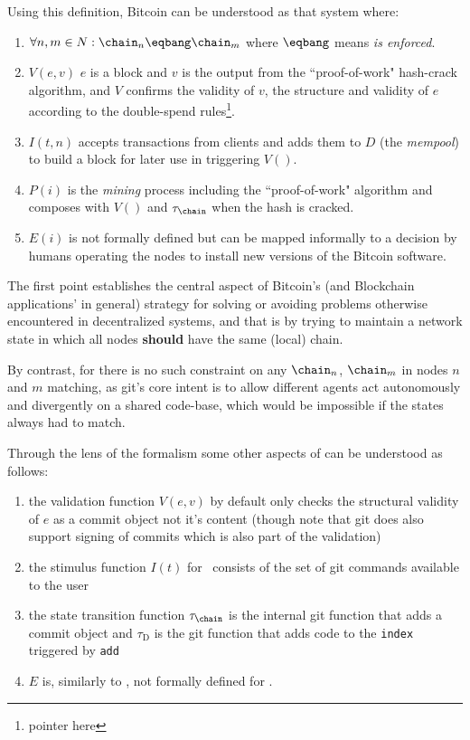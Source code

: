 \documentclass[twocolumn,showpacs,
  nofootinbib,aps,superscriptaddress,
  eqsecnum,prd,notitlepage,showkeys,10pt]{revtex4-1}
\begin{document}
Using this definition, Bitcoin can be understood as that system \sbtc where:
\begin{enumerate}
\item $\forall n,m \in N: \chain_n\eqbang\chain_m$ where $\eqbang$ means \textit{is enforced}.
\item $V(e,v)$ $e$ is a block and $v$ is the output from the ``proof-of-work" hash-crack algorithm, and $V$ confirms the validity of $v$, the structure and validity of $e$ according to the double-spend rules\footnote{pointer here}.
\item $I(t,n)$ accepts transactions from clients and adds them to $D$ (the \textit{mempool}) to build a block for later use in triggering $V()$.
\item $P(i)$ is the \textit{mining} process including the ``proof-of-work" algorithm and composes with $V()$ and $\tau_\chain$ when the hash is cracked.
\item $E(i)$ is not formally defined but can be mapped informally to a decision by humans operating the nodes to install new versions of the Bitcoin software.
\end{enumerate}

The first point establishes the central aspect of Bitcoin's (and Blockchain applications' in general) strategy for solving or avoiding problems otherwise encountered in decentralized systems, and that is by trying to maintain a network state in which all nodes \textbf{should} have the same (local) chain.

By contrast, for \sgit there is no such constraint on any $\chain_n$, $\chain_m$ in nodes $n$ and $m$ matching, as git's core intent is to allow different agents act autonomously and divergently on a shared code-base, which would be impossible if the states always had to match.

Through the lens of the formalism some other aspects of \sgit can be understood as follows:
\begin{enumerate}
\item the validation function $V(e,v)$ by default only checks the structural validity of $e$ as a commit object not it's content (though note that git does also support signing of commits which is also part of the validation)
\item the stimulus function $I(t)$ for \sgit\ consists of the set of git commands available to the user
\item the state transition function $\tau_\chain$ is the internal git function that adds a commit object and $\tau_\textrm{D}$ is the git function that adds code to the \texttt{index} triggered by \texttt{add}
\item $E$ is, similarly to \sbtc, not formally defined for \sgit.
\end{enumerate}
\end{document}
